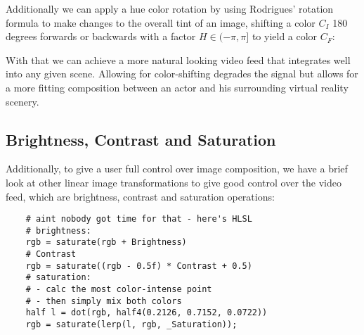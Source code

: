 Additionally we can apply a hue color rotation by using Rodrigues' rotation 
formula to make changes to the overall tint of an image, shifting a color $C_I$ 
180 degrees forwards or backwards with a factor $H \in (-\pi, \pi]$ to yield a 
color $C_F$:

With that we can achieve a more natural looking video feed that integrates well 
into any given scene. Allowing for color-shifting degrades the signal but 
allows for a more fitting composition between an actor and his surrounding 
virtual reality scenery.

\subsection{Brightness, Contrast and Saturation}

Additionally, to give a user full control over image composition, we have a 
brief look at other linear image transformations to give good control over the 
video feed, which are brightness, contrast and saturation operations:

\begin{lstlisting}
	# aint nobody got time for that - here's HLSL
	# brightness:
	rgb = saturate(rgb + Brightness)
	# Contrast
	rgb = saturate((rgb - 0.5f) * Contrast + 0.5)
	# saturation:
	# - calc the most color-intense point
	# - then simply mix both colors
	half l = dot(rgb, half4(0.2126, 0.7152, 0.0722))
	rgb = saturate(lerp(l, rgb, _Saturation));
\end{lstlisting}


